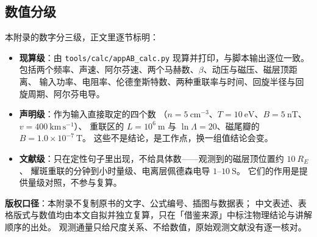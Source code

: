 \subsection*{数值分级}

本附录的数字分三级，正文里逐节标明：

\begin{itemize}
\item \textbf{现算级}：由 \texttt{tools/\allowbreak{}calc/\allowbreak{}appAB\_calc.py} 现算并打印，与脚本输出逐位一致。
包括两个频率、声速、阿尔芬速、两个马赫数、$\beta$、动压与磁压、磁层顶距离、
输入功率、电阻率、伦德奎斯特数、两种重联率与时间、回旋半径与回旋周期、阿尔芬电导。
\item \textbf{声明级}：作为输入直接取定的四个数
（$n=5\ \mathrm{cm^{-3}}$、$T=10\ \mathrm{eV}$、$B=5\ \mathrm{nT}$、$v=400\ \mathrm{km\,s^{-1}}$）、
重联区的 $L=10^{6}\ \mathrm{m}$ 与 $\ln\Lambda=20$、磁尾瓣的 $B=1.0\times10^{-7}\ \mathrm{T}$。
这些不是结论，是工作点，换一组值结论会变。
\item \textbf{文献级}：只在定性句子里出现，不给具体数——观测到的磁层顶位置约 $10\ R_E$、
耀斑重联的分钟到小时量级、电离层佩德森电导 $1$--$10\ \mathrm{S}$。
它们的作用是提供量级对照，不参与复算。
\end{itemize}

\enlargethispage{3\baselineskip}
\textbf{版权口径}：本附录不复制原书的文字、公式编号、插图与数据表；
中文表述、表格版式与数值均由本文自拟并独立复算，只在「借鉴来源」中标注物理结论与讲解顺序的出处。
观测通量只给尺度关系、不给数值，原始观测文献没有逐一核对。
\endgroup
